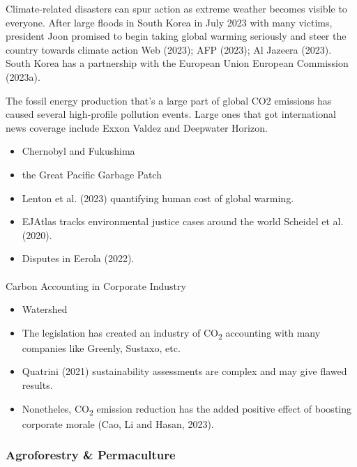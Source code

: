 \documentclass[
  letterpaper,
  DIV=11,
  numbers=noendperiod]{scrartcl}
\makeatletter
\let\oldparagraph\paragraph
\renewcommand{\paragraph}{
    \@ifstar
      \xxxParagraphStar
      \xxxParagraphNoStar
  }
\newcommand{\xxxParagraphStar}[1]{\oldparagraph*{#1}\mbox{}}
\newcommand{\xxxParagraphNoStar}[1]{\oldparagraph{#1}\mbox{}}
\providecommand{\tightlist}{%
  \setlength{\itemsep}{0pt}\setlength{\parskip}{0pt}}\usepackage{longtable,booktabs,array}
\makeatother
\begin{document}
Climate-related disasters can spur action as extreme weather becomes
visible to everyone. After large floods in South Korea in July 2023 with
many victims, president Joon promised to begin taking global warming
seriously and steer the country towards climate action Web (2023); AFP
(2023); Al Jazeera (2023). South Korea has a partnership with the
European Union European Commission (2023a).

The fossil energy production that's a large part of global CO2 emissions
has caused several high-profile pollution events. Large ones that got
international news coverage include Exxon Valdez and Deepwater Horizon.

\begin{itemize}
\tightlist
\item
  Chernobyl and Fukushima
\item
  the Great Pacific Garbage Patch
\item
  Lenton et al. (2023) quantifying human cost of global warming.
\item
  EJAtlas tracks environmental justice cases around the world Scheidel
  et al. (2020).
\item
  Disputes in Eerola (2022).
\end{itemize}

\paragraph{Carbon Accounting in Corporate
Industry}\label{carbon-accounting-in-corporate-industry}

\begin{itemize}
\item
  Watershed
\item
  The legislation has created an industry of CO\textsubscript{2}
  accounting with many companies like Greenly, Sustaxo, etc.
\item
  Quatrini (2021) sustainability assessments are complex and may give
  flawed results.
\item
  Nonetheles, CO\textsubscript{2} emission reduction has the added
  positive effect of boosting corporate morale (Cao, Li and Hasan,
  2023).
\end{itemize}

\subsubsection{Agroforestry \&
Permaculture}\label{agroforestry-permaculture}
\end{document}
